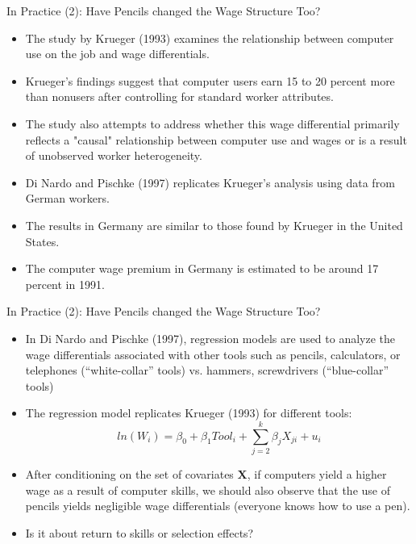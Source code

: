 \documentclass[notes,10pt, aspectratio=169]{beamer}
\begin{document}
\begin{frame}{In Practice (2): Have Pencils changed the Wage Structure Too?}
\begin{itemize}
  \item The study by Krueger (1993) examines the relationship between computer use on the job and wage differentials.\\[1em]
  \item Krueger's findings suggest that computer users earn 15 to 20 percent more than nonusers after controlling for standard worker attributes.\\[1em]
  \item The study also attempts to address whether this wage differential primarily reflects a "causal" relationship between computer use and wages or is a result of unobserved worker heterogeneity.\\[1em]
  \item Di Nardo and Pischke (1997) replicates Krueger's analysis using data from German workers.\\[1em]
  \item The results in Germany are similar to those found by Krueger in the United States.\\[1em]
  \item The computer wage premium in Germany is estimated to be around 17 percent in 1991.
\end{itemize}
\end{frame}


\begin{frame}{In Practice (2): Have Pencils changed the Wage Structure Too?}
\begin{itemize}
  \item In Di Nardo and Pischke (1997), regression models are used to analyze the wage differentials associated with other tools such as pencils, calculators, or telephones (``white-collar'' tools) vs. hammers, screwdrivers (``blue-collar'' tools)\\[1em]
  \item The regression model replicates Krueger (1993) for different tools:
    \begin{equation}
          ln(W_i) = \beta_0 + \beta_1 Tool_i + \sum_{j=2}^k \beta_j X_{ji} + u_i
    \end{equation}
  \item After conditioning on the set of covariates $\mathbf{X}$, if computers yield a higher wage as a result of computer skills, we should also observe that the use of pencils yields negligible wage differentials (everyone knows how to use a pen).\\[1em]
  \item Is it about return to skills or selection effects?
\end{itemize}
\end{frame}
\end{document}
